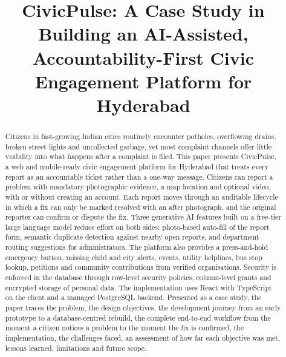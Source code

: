 \documentclass[conference]{IEEEtran}
\begin{document}
\title{CivicPulse: A Case Study in Building an AI-Assisted, Accountability-First Civic Engagement Platform for Hyderabad}
\author{
\and
{}
\and
{}
}
\maketitle
\begin{abstract}
Citizens in fast-growing Indian cities routinely encounter potholes, overflowing drains, broken street lights and uncollected garbage, yet most complaint channels offer little visibility into what happens after a complaint is filed. This paper presents CivicPulse, a web and mobile-ready civic engagement platform for Hyderabad that treats every report as an accountable ticket rather than a one-way message. Citizens can report a problem with mandatory photographic evidence, a map location and optional video, with or without creating an account. Each report moves through an auditable lifecycle in which a fix can only be marked resolved with an after photograph, and the original reporter can confirm or dispute the fix. Three generative AI features built on a free-tier large language model reduce effort on both sides: photo-based auto-fill of the report form, semantic duplicate detection against nearby open reports, and department routing suggestions for administrators. The platform also provides a press-and-hold emergency button, missing child and city alerts, events, utility helplines, bus stop lookup, petitions and community contributions from verified organisations. Security is enforced in the database through row-level security policies, column-level grants and encrypted storage of personal data. The implementation uses React with TypeScript on the client and a managed PostgreSQL backend. Presented as a case study, the paper traces the problem, the design objectives, the development journey from an early prototype to a database-centred rebuild, the complete end-to-end workflow from the moment a citizen notices a problem to the moment the fix is confirmed, the implementation, the challenges faced, an assessment of how far each objective was met, lessons learned, limitations and future scope.
\end{abstract}
\end{document}
